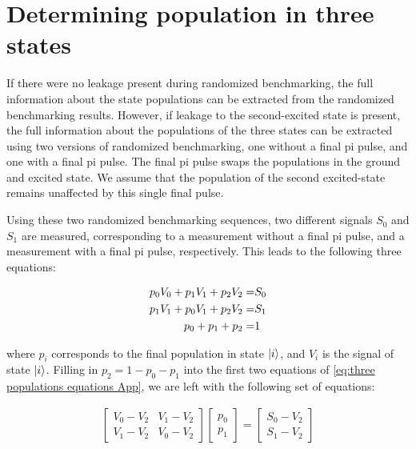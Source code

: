     \section{Determining population in three states}
      \label{ssec:Determining population in three states}
      If there were no leakage present during randomized benchmarking, the full information about the state populations can be extracted from the randomized benchmarking results. However, if leakage to the second-excited state is present, the full information about the populations of the three states can be extracted using two versions of randomized benchmarking, one without a final pi pulse, and one with a final pi pulse. The final pi pulse swaps the populations in the ground and excited state. We assume that the population of the second excited-state remains unaffected by this single final pulse.

      Using these two randomized benchmarking sequences, two different signals $S_0$ and $S_1$ are measured, corresponding to a measurement without a final pi pulse, and a measurement with a final pi pulse, respectively. This leads to the following three equations:

      \begin{align}
        p_0 V_0 + p_1 V_1 + p_2 V_2 = & S_0 \notag\\
        p_1 V_1 + p_0 V_1 + p_2 V_2 = & S_1 \notag\\
        p_0 + p_1 + p_2 = &   1
        \label{eq:three populations equations App}
      \end{align}

      where $p_i$ corresponds to the final population in state $\ket{i}$, and $V_i$ is the signal of state $\ket{i}$.  Filling in $p_2 = 1 - p_0 - p_1$ into the first two equations of \ref{eq:three populations equations App}, we are left with the following set of equations:

      \begin{align}
        \begin{bmatrix}
          V_0 - V_2 & V_1 - V_2 \\
          V_1 - V_2 & V_0 - V_2
        \end{bmatrix}
        \begin{bmatrix}
          p_0 \\
          p_1
        \end{bmatrix}
        =
        \begin{bmatrix}
          S_0 - V_2 \\
          S_1 - V_2
        \end{bmatrix}
      \end{align}

